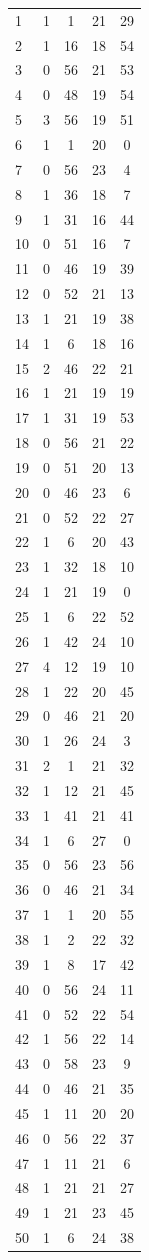 \documentclass[12pt,a4paper]{report}
\begin{document}
\begin{appendices}
\begin{longtable}{lcccc}
1 & 1 & 1 & 21 & 29 \\
2 & 1 & 16 & 18 & 54 \\
3 & 0 & 56 & 21 & 53 \\
4 & 0 & 48 & 19 & 54 \\
5 & 3 & 56 & 19 & 51 \\
6 & 1 & 1 & 20 & 0 \\
7 & 0 & 56 & 23 & 4 \\
8 & 1 & 36 & 18 & 7 \\
9 & 1 & 31 & 16 & 44 \\
10 & 0 & 51 & 16 & 7 \\
11 & 0 & 46 & 19 & 39 \\
12 & 0 & 52 & 21 & 13 \\
13 & 1 & 21 & 19 & 38 \\
14 & 1 & 6 & 18 & 16 \\
15 & 2 & 46 & 22 & 21 \\
16 & 1 & 21 & 19 & 19 \\
17 & 1 & 31 & 19 & 53 \\
18 & 0 & 56 & 21 & 22 \\
19 & 0 & 51 & 20 & 13 \\
20 & 0 & 46 & 23 & 6 \\
21 & 0 & 52 & 22 & 27 \\
22 & 1 & 6 & 20 & 43 \\
23 & 1 & 32 & 18 & 10 \\
24 & 1 & 21 & 19 & 0 \\
25 & 1 & 6 & 22 & 52 \\
26 & 1 & 42 & 24 & 10 \\
27 & 4 & 12 & 19 & 10 \\
28 & 1 & 22 & 20 & 45 \\
29 & 0 & 46 & 21 & 20 \\
30 & 1 & 26 & 24 & 3 \\
31 & 2 & 1 & 21 & 32 \\
32 & 1 & 12 & 21 & 45 \\
33 & 1 & 41 & 21 & 41 \\
34 & 1 & 6 & 27 & 0 \\
35 & 0 & 56 & 23 & 56 \\
36 & 0 & 46 & 21 & 34 \\
37 & 1 & 1 & 20 & 55 \\
38 & 1 & 2 & 22 & 32 \\
39 & 1 & 8 & 17 & 42 \\
40 & 0 & 56 & 24 & 11 \\
41 & 0 & 52 & 22 & 54 \\
42 & 1 & 56 & 22 & 14 \\
43 & 0 & 58 & 23 & 9 \\
44 & 0 & 46 & 21 & 35 \\
45 & 1 & 11 & 20 & 20 \\
46 & 0 & 56 & 22 & 37 \\
47 & 1 & 11 & 21 & 6 \\
48 & 1 & 21 & 21 & 27 \\
49 & 1 & 21 & 23 & 45 \\
50 & 1 & 6 & 24 & 38 \\
\bottomrule
\end{longtable}


\end{appendices}
\end{document}
